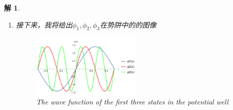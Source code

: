 \documentclass{article}
\newtheorem{solution}{解}
\newcommand{\expectation}[1]{\langle #1 \rangle}
\begin{document}
\begin{solution}
\begin{enumerate}
\begin{enumerate}
        \item[n=2] 
        \begin{align*}
            \phi_1(x)&=\sqrt{\frac{2}{L}}\sin{\frac{4\pi x}{L}}\\
            \expectation{x}&=0\\
            \expectation{x^2}&=\frac{L^2}{12}\left(1-\frac{1}{16\pi^2}\right)\\
            \expectation{p}&=0\\
            \expectation{p^2}&=\frac{16\hbar^2\pi^2}{L^2}
        \end{align*}
        \item[n=3]
        \begin{align*}
            \phi_1(x)&=\sqrt{\frac{2}{L}}\sin{\frac{8\pi x}{L}}\\
            \expectation{x}&=0\\
            \expectation{x^2}&=\frac{L^2}{12}\left(1-\frac{1}{36\pi^2}\right)\\
            \expectation{p}&=0\\
            \expectation{p^2}&=\frac{36\hbar^2\pi^2}{L^2}
        \end{align*}
    \end{enumerate}
    \item[(4)] 接下来，我将给出$\phi_1,\phi_2,\phi_3$在势阱中的的图像 
    \begin{figure}[hbtp]
        \centering
        \includegraphics[width=0.5\textwidth]{figure/一维无线深方势阱的波函数解.png}
        \caption{The wave function of the first three states in the potential well}
        \label{fig:wave_function}
    \end{figure}
    \end{enumerate}
    
        
\end{solution}
\end{document}

